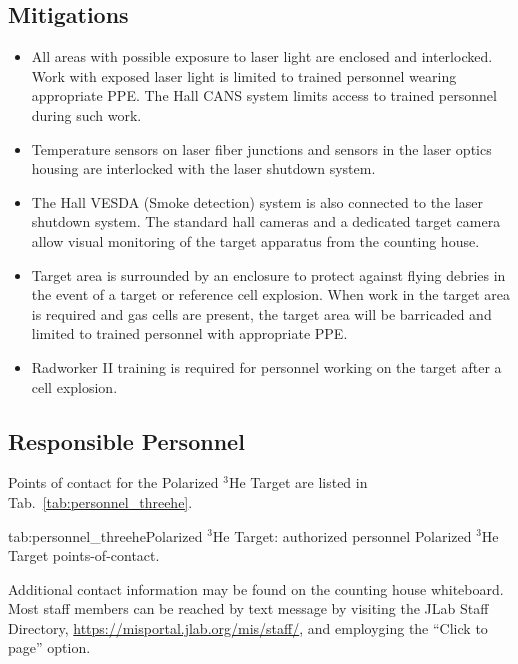 \subsection{Mitigations}
\begin{itemize}
\item All areas with possible exposure to laser light are enclosed and
  interlocked.  Work with exposed laser light is limited to trained
  personnel wearing appropriate PPE.  The Hall CANS system limits
  access to trained personnel during such work.
\item Temperature sensors on laser fiber junctions and sensors in the
  laser optics housing are interlocked with the laser shutdown
  system.
\item   The Hall VESDA (Smoke detection) system is also connected
  to the laser shutdown system.  The standard hall cameras and a
  dedicated target camera allow visual monitoring of the target
  apparatus from the counting house.
\item Target area is surrounded by an enclosure to protect against flying
  debries in the event of a target or reference cell explosion.  When
work in the target area is required and gas cells are present, the
target area will be barricaded and limited to trained personnel with
appropriate PPE.
\item Radworker II training is required for personnel working on the
  target after a cell explosion.
\end{itemize}

\subsection{Responsible Personnel}

Points of contact for the Polarized ${}^3$He Target are listed in Tab.~\ref{tab:personnel_threehe}.

\begin{namestab}{tab:personnel_threehe}{Polarized ${}^3$He Target: authorized personnel}
   {Polarized ${}^3$He Target points-of-contact.}
  \ArunTadepalli{}
\end{namestab}

Additional contact information may be found on the counting house
whiteboard.  Most staff members can be reached by text message by
visiting the JLab Staff Directory,
\url{https://misportal.jlab.org/mis/staff/}, and employging
the ``Click to page'' option.
